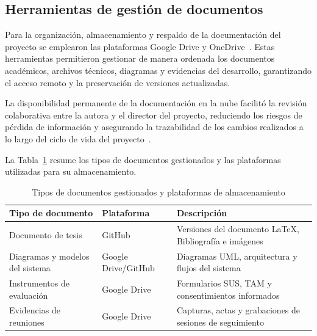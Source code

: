 			\subsection{Herramientas de gestión de documentos}
				Para la organización, almacenamiento y respaldo de la documentación del proyecto se emplearon las plataformas Google Drive y OneDrive~\cite{Kleppmann2017}. Estas herramientas permitieron gestionar de manera ordenada los documentos académicos, archivos técnicos, diagramas y evidencias del desarrollo, garantizando el acceso remoto y la preservación de versiones actualizadas.
				
				La disponibilidad permanente de la documentación en la nube facilitó la revisión colaborativa entre la autora y el director del proyecto, reduciendo los riesgos de pérdida de información y asegurando la trazabilidad de los cambios realizados a lo largo del ciclo de vida del proyecto~\cite{Fowler2002}.
				
				La Tabla~\ref{tab:documentos} resume los tipos de documentos gestionados y las plataformas utilizadas para su almacenamiento.
				
				\begin{table}[H]
					\centering
					\small
					\caption{Tipos de documentos gestionados y plataformas de almacenamiento}
					\label{tab:documentos}
					\begin{tabular}{p{5cm}p{3.5cm}p{5.5cm}}
						\hline
						\textbf{Tipo de documento} & \textbf{Plataforma} & \textbf{Descripción} \\
						\hline
						Documento de tesis & GitHub & Versiones del documento LaTeX, Bibliografía e imágenes\\
						
						Diagramas y modelos del sistema & Google Drive/GitHub & Diagramas UML, arquitectura y flujos del sistema \\
						
						Instrumentos de evaluación & Google Drive & Formularios SUS, TAM y consentimientos informados \\
						
						Evidencias de reuniones & Google Drive & Capturas, actas y grabaciones de sesiones de seguimiento \\
						\hline
					\end{tabular}
				\end{table}
				\tblnote
				
